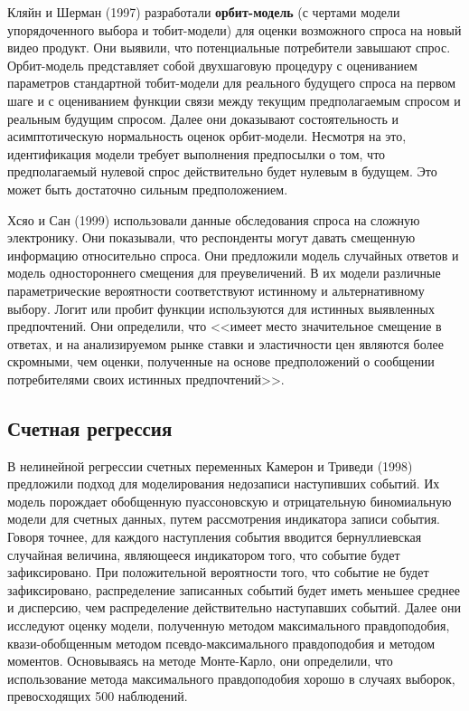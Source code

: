 Кляйн и Шерман (1997) разработали {\bf орбит-модель} (с чертами модели упорядоченного выбора и тобит-модели) для оценки возможного спроса на новый видео продукт. Они выявили, что потенциальные потребители завышают спрос. Орбит-модель представляет собой двухшаговую процедуру с оцениванием параметров стандартной тобит-модели для реального будущего спроса на первом шаге и с оцениванием функции связи между текущим предполагаемым спросом и реальным будущим спросом. Далее они доказывают состоятельность и асимптотическую нормальность оценок орбит-модели. Несмотря на это, идентификация модели требует выполнения предпосылки о том, что предполагаемый нулевой спрос действительно будет нулевым в будущем. Это может быть достаточно сильным предположением.
 
Хсяо и Сан (1999) использовали данные обследования спроса на сложную электронику. Они показывали, что респонденты могут давать смещенную информацию относительно спроса. Они предложили модель случайных ответов и модель одностороннего смещения для преувеличений.  В их модели  различные параметрические вероятности соответствуют истинному и альтернативному выбору.  Логит или пробит функции используются для истинных выявленных предпочтений. Они определили, что <<имеет место значительное смещение в ответах, и на анализируемом рынке ставки и эластичности цен являются более скромными, чем оценки, полученные на основе  предположений о сообщении потребителями своих истинных предпочтений>>.

\subsection*{Счетная регрессия} 
В нелинейной регрессии счетных переменных Камерон и Триведи (1998) предложили подход для моделирования недозаписи наступивших событий. Их модель порождает обобщенную пуассоновскую и отрицательную биномиальную модели для счетных данных, путем рассмотрения индикатора записи события.  Говоря точнее, для каждого наступления события вводится бернуллиевская случайная величина, являющееся индикатором того, что событие будет зафиксировано. При положительной вероятности того, что событие не будет зафиксировано,  распределение записанных событий будет иметь меньшее среднее и дисперсию, чем распределение действительно наступавших событий. Далее они исследуют оценку модели, полученную методом максимального правдоподобия, квази-обобщенным методом псевдо-максимального правдоподобия и методом моментов. Основываясь на методе Монте-Карло, они определили, что использование метода максимального правдоподобия хорошо в случаях выборок, превосходящих 500 наблюдений.

